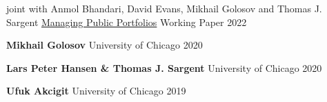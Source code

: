 


\begin{cventries}

  \cventry
  {joint with Anmol Bhandari, David Evans, Mikhail Golosov and Thomas J. Sargent} %
  {\href{https://static1.squarespace.com/static/54c19f18e4b0ef5f4b9f8dae/t/6328ee5213a65c43a48423f8/1663626851912/abegs4draft.pdf}{Managing Public Portfolios} } %
  {Working Paper} %
  {2022} %
  {}

\end{cventries}


\begin{cvhonors}
  \cvhonor
  {\textbf{Mikhail Golosov}} %
  {University of Chicago} %
  {} %
  {2020} %

  \cvhonor
  {\textbf{Lars Peter Hansen \& Thomas J. Sargent}} %
  {University of Chicago} %
  {} %
  {2020} %

  \cvhonor
  {\textbf{Ufuk Akcigit}} %
  {University of Chicago} %
  {} %
  {2019} %

\end{cvhonors}

